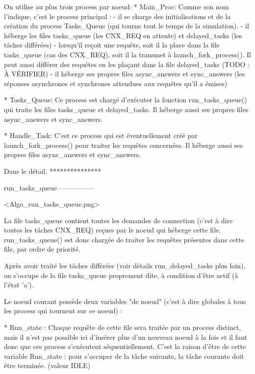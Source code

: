On utilise au plus trois process par noeud:
    * Main_Proc:
      Comme son nom l'indique, c'est le process principal :
        - il se charge des initialisations et de la création du process Tasks_Queue (qui tourne
          tout le temps de la simulation).
        - il héberge les files tasks_queue (les CNX_REQ en attente) et delayed_tasks (les tâches
          différées)
        - lorsqu'il reçoit une requête, soit il la place dans la file tasks_queue (cas des
          CNX_REQ), soit il la transmet à launch_fork_process(). Il peut aussi différer des requêtes
          en les plaçant dans la file delayed_tasks (TODO : À VÉRIFIER)
        - il héberge ses propres files async_answers et sync_answers (les réponses asynchrones et
          synchrones attendues aux requêtes qu'il a émises)

    * Tasks_Queue:
      Ce process est chargé d'exécuter la fonction run_tasks_queue() qui traite les files
      tasks_queue et delayed_tasks.
      Il héberge aussi ses propres files async_answers et sync_answers.

    * Handle_Task:
      C'est ce process qui est éventuellement créé par launch_fork_process() pour traiter les
      requêtes concernées.
      Il héberge aussi ses propres files async_answers et sync_answers.

Dans le détail.
***************

run_tasks_queue
---------------

<Algo_run_tasks_queue.png>

La file tasks_queue contient toutes les demandes de connection (c'est à dire toutes les tâches
CNX_REQ) reçues par le noeud qui héberge cette file. run_tasks_queue() est donc chargée de traiter
les requêtes présentes dans cette file, par ordre de priorité.

Après avoir traité les tâches différées (voir détails run_delayed_tasks plus loin), on s'occupe de
la file tasks_queue proprement dite, à condition d'être actif (à l'état 'a').

Le noeud courant possède deux variables "de noeud" (c'est à dire globales à tous les process qui
tournent sur ce noeud) :

* Run_state :
Chaque requête de cette file sera traitée par un process distinct, mais il n'est pas possible ici
d'insérer plus d'un nouveau noeud à la fois et il faut donc que ces process s'exécutent
séquentiellement. C'est la raison d'être de cette variable Run_state : pour s'occuper de la tâche
suivante, la tâche courante doit être terminée. (valeur IDLE)

